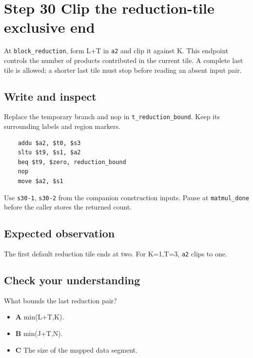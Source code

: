 \section{Step 30 Clip the reduction-tile exclusive end}\label{matmul-s30}

At \texttt{block\_reduction}, form L+T in \texttt{a2} and clip it against K. This endpoint controls the number of products contributed in the current tile. A complete last tile is allowed; a shorter last tile must stop before reading an absent input pair.

\subsection{Write and inspect}
Replace the temporary branch and nop in \texttt{t\_reduction\_bound}. Keep its surrounding labels and region markers.

\begin{verbatim}
    addu $a2, $t0, $s3
    sltu $t9, $s1, $a2
    beq $t9, $zero, reduction_bound
    nop
    move $a2, $s1
\end{verbatim}
Use \texttt{s30-1}, \texttt{s30-2} from the companion construction inputs. Pause at \texttt{matmul\_done} before the caller stores the returned count.

\subsection{Expected observation}
The first default reduction tile ends at two. For K=1,T=3, \texttt{a2} clips to one.

\subsection{Check your understanding}
What bounds the last reduction pair?

\begin{itemize}
  \item \textbf{A} min(L+T,K).
  \item \textbf{B} min(J+T,N).
  \item \textbf{C} The size of the mapped data segment.
\end{itemize}
